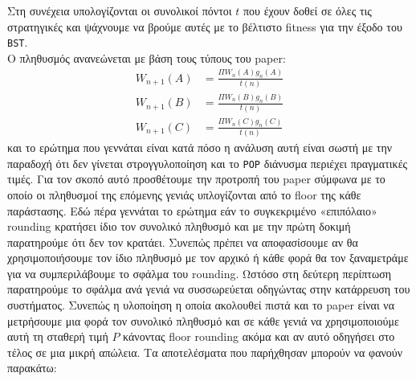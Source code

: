 Στη συνέχεια υπολογίζονται οι συνολικοί πόντοι \(t\) που έχουν δοθεί σε όλες τις στρατηγικές και ψάχνουμε να βρούμε αυτές με το βέλτιστο fitness για την έξοδο του \texttt{BST}.
\\
Ο πληθυσμός ανανεώνεται με βάση τους τύπους του paper\cite{paper}: \begin{align*}
W_{n+1}(A) &= \frac{\Pi W_n(A) g_n(A)}{t(n)} \\
W_{n+1}(B) &= \frac{\Pi W_n(B) g_n(B)}{t(n)} \\
W_{n+1}(C) &= \frac{\Pi W_n(C) g_n(C)}{t(n)}
\end{align*} και το ερώτημα που γεννάται είναι κατά πόσο η ανάλυση αυτή είναι σωστή με την παραδοχή ότι δεν γίνεται στρογγυλοποίηση και το \texttt{POP} διάνυσμα περιέχει πραγματικές τιμές.
Για τον σκοπό αυτό προσθέτουμε την προτροπή του paper σύμφωνα με το οποίο οι πληθυσμοί της επόμενης γενιάς υπλογίζονται από το floor της κάθε παράστασης.
Εδώ πέρα γεννάται το ερώτημα εάν το συγκεκριμένο «επιπόλαιο» rounding κρατήσει ίδιο τον συνολικό πληθυσμό και με την πρώτη δοκιμή παρατηρούμε ότι δεν τον κρατάει. Συνεπώς πρέπει να αποφασίσουμε αν θα χρησιμοποιήσουμε τον ίδιο πληθυσμό με τον αρχικό ή κάθε φορά θα τον ξαναμετράμε για να συμπεριλάβουμε το σφάλμα του rounding. Ωστόσο στη δεύτερη περίπτωση παρατηρούμε το σφάλμα ανά γενιά να συσσωρεύεται οδηγώντας στην κατάρρευση του συστήματος. 
Συνεπώς η υλοποίηση η οποία ακολουθεί πιστά και το paper είναι να μετρήσουμε μια φορά τον συνολικό πληθυσμό και σε κάθε γενιά να χρησιμοποιούμε αυτή τη σταθερή τιμή \(P \) κάνοντας floor rounding ακόμα και αν αυτό οδηγήσει στο τέλος σε μια μικρή απώλεια.
Τα αποτελέσματα που παρήχθησαν μπορούν να φανούν παρακάτω:
